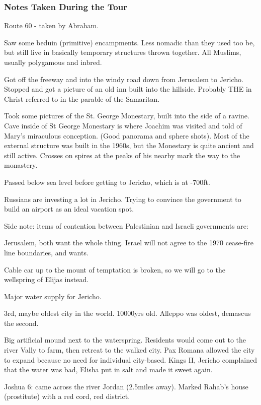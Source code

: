 \documentclass[letterpaper]{report}
\begin{document}
\subsubsection{Notes Taken During the Tour}
Route 60 - taken by Abraham.

Saw some beduin (primitive) encampments. Less nomadic than they used too be, but still live in basically temporary structures thrown together.  All Muslims, usually polygamous and inbred.

Got off the freeway and into the windy road down from Jerusalem to Jericho. Stopped and got a picture of an old inn built into the hillside. Probably THE in Christ referred to in the parable of the Samaritan.

Took some pictures of the St. George Monestary, built into the side of a ravine. Cave inside of St George Monestary is where Joachim was visited and told of Mary's miraculous conception. (Good panorama and sphere shots). Most of the external structure was built in the 1960s, but the Monestary is quite ancient and still active. Crosses on spires at the peaks of his nearby mark the way to the monastery.

Passed below sea level before getting to Jericho, which is at -700ft.

Russians are investing a lot in Jericho. Trying to convince the government to build an airport as an ideal vacation spot.

Side note: items of contention between Palestinian and Israeli governments are:

Jerusalem, both want the whole thing.
Israel will not agree to the 1970 cease-fire line boundaries, and wants.

Cable car up to the mount of temptation is broken, so we will go to the wellspring of Elijas instead.

Major water supply for Jericho.

3rd, maybe oldest city in the world. 10000yrs old.
Alleppo was oldest, demascus the second.

Big artificial mound next to the waterspring. Residents would come out to the river Vally to farm, then retreat to the walked city.
Pax Romana allowed the city to expand because no need for individual city-based. Kings II, Jericho complained that the water was bad, Elisha put in salt and made it sweet again.

Joshua 6: came across the river Jordan (2.5miles away).  Marked Rahab's house (prostitute) with a red cord, red district.
\end{document}
